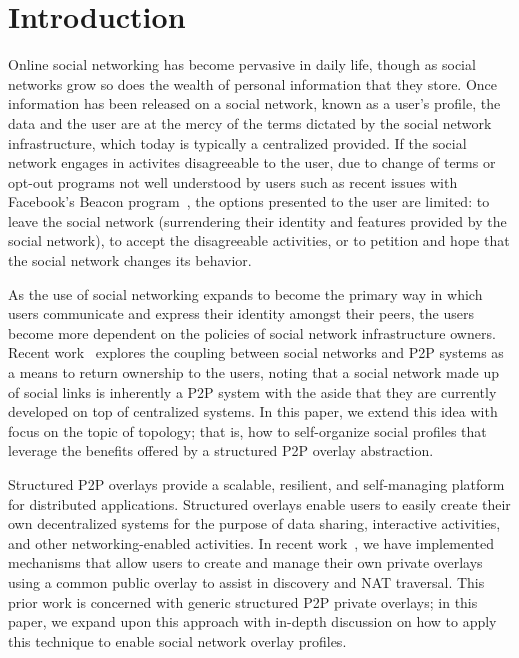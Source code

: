 \documentclass[letterpaper,twocolumn,10pt]{article}
\begin{document}
\section{Introduction}
Online social networking has become pervasive in daily life, though as social
networks grow so does the wealth of personal information that they store.  Once
information has been released on a social network, known as a user's profile,
the data and the user are at the mercy of the terms dictated by the social network 
infrastructure, which today is typically a centralized provided.  If the social
network engages in activites disagreeable to the user, due to change of terms or opt-out programs not well understood by users such as recent issues
with Facebook's Beacon program~\cite{facebook_beacon}, the options presented to the user are limited:
to leave the social network (surrendering their identity and features provided
by the social network), to accept the disagreeable activities, or to petition
and hope that the social network changes its behavior. 

As the use of social networking expands to become the primary way in which users
communicate and express their identity amongst their peers, the users become
more dependent on the policies of social network infrastructure owners.  Recent
work~\cite{p2p_socialnetwork} explores the coupling between social networks and
P2P systems as a means to return ownership to the users, noting that a social
network made up of social links is inherently a P2P system with the aside that
they are currently developed on top of centralized systems.  In this paper, we
extend this idea with focus on the topic of topology; that is, how to self-organize
social profiles that leverage the benefits offered by a structured P2P overlay abstraction.

Structured P2P overlays provide a scalable, resilient, and self-managing
platform for distributed applications.  Structured overlays enable users to
easily create their own decentralized systems for the purpose of data sharing,
interactive activities, and other networking-enabled activities.  In recent
work~\cite{icdcs10}, we have implemented mechanisms that allow users to create
and manage their own private overlays using a common public overlay to assist
in discovery and NAT traversal. This prior work is concerned with generic structured P2P
private overlays; in this paper, we
expand upon this approach with in-depth discussion on how to apply this technique to
enable social network overlay profiles.
\end{document}
